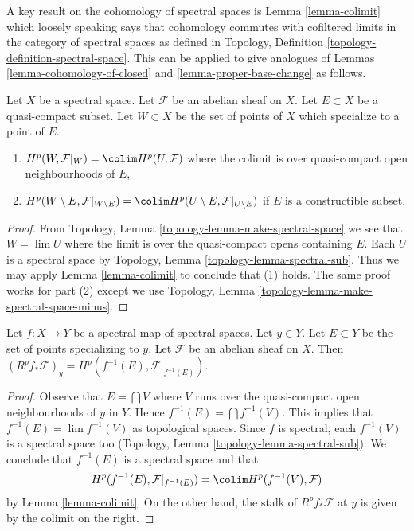 \noindent
A key result on the cohomology of spectral spaces is Lemma \ref{lemma-colimit}
which loosely speaking says that cohomology commutes with cofiltered limits
in the category of spectral spaces as defined in
Topology, Definition \ref{topology-definition-spectral-space}.
This can be applied to give analogues of
Lemmas \ref{lemma-cohomology-of-closed} and \ref{lemma-proper-base-change}
as follows.

\begin{lemma}
\label{lemma-cohomology-of-neighbourhoods-of-closed}
Let $X$ be a spectral space. Let $\mathcal{F}$ be an abelian sheaf on $X$.
Let $E \subset X$ be a quasi-compact subset. Let $W \subset X$ be the set of
points of $X$ which specialize to a point of $E$.
\begin{enumerate}
\item $H^p(W, \mathcal{F}|_W) = \colim H^p(U, \mathcal{F})$
where the colimit is over quasi-compact open neighbourhoods of $E$,
\item $H^p(W \setminus E, \mathcal{F}|_{W \setminus E}) =
\colim H^p(U \setminus E, \mathcal{F}|_{U \setminus E})$
if $E$ is a constructible subset.
\end{enumerate}
\end{lemma}

\begin{proof}
From Topology, Lemma \ref{topology-lemma-make-spectral-space}
we see that $W = \lim U$ where the limit is over the quasi-compact
opens containing $E$. Each $U$ is a spectral space by
Topology, Lemma \ref{topology-lemma-spectral-sub}.
Thus we may apply Lemma \ref{lemma-colimit} to conclude that (1) holds.
The same proof works for part (2) except we use
Topology, Lemma \ref{topology-lemma-make-spectral-space-minus}.
\end{proof}

\begin{lemma}
\label{lemma-proper-base-change-spectral}
Let $f : X \to Y$ be a spectral map of spectral spaces. Let $y \in Y$.
Let $E \subset Y$ be the set of points specializing to $y$.
Let $\mathcal{F}$ be an abelian sheaf on $X$.
Then $(R^pf_*\mathcal{F})_y = H^p(f^{-1}(E), \mathcal{F}|_{f^{-1}(E)})$.
\end{lemma}

\begin{proof}
Observe that $E = \bigcap V$ where $V$ runs over the quasi-compact
open neighbourhoods of $y$ in $Y$. Hence $f^{-1}(E) = \bigcap f^{-1}(V)$.
This implies that $f^{-1}(E) = \lim f^{-1}(V)$ as topological spaces.
Since $f$ is spectral, each $f^{-1}(V)$ is a spectral space too
(Topology, Lemma \ref{topology-lemma-spectral-sub}).
We conclude that $f^{-1}(E)$ is a spectral space and that
$$
H^p(f^{-1}(E), \mathcal{F}|_{f^{-1}(E)}) =
\colim H^p(f^{-1}(V), \mathcal{F})
$$
by Lemma \ref{lemma-colimit}. On the other hand, the stalk of
$R^pf_*\mathcal{F}$ at $y$ is given by the colimit on the right.
\end{proof}

